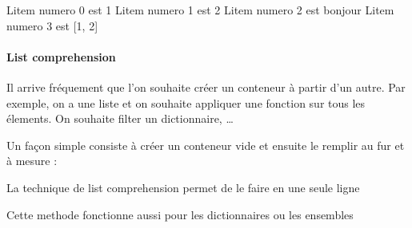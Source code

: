 \documentclass[letterpaper,10pt,english]{sphinxhowto}
\begin{document}
\begin{sphinxVerbatim}[commandchars=\\\{\}]
L\PYGZsq{}item numero 0 est 1
L\PYGZsq{}item numero 1 est 2
L\PYGZsq{}item numero 2 est bonjour
L\PYGZsq{}item numero 3 est [1, 2]
\end{sphinxVerbatim}


\paragraph{List comprehension}
\label{\detokenize{cours3_conteneur_cours:list-comprehension}}
\sphinxAtStartPar
Il arrive fréquement que l’on souhaite créer un conteneur à partir d’un autre. Par exemple, on a une liste et on souhaite appliquer une fonction sur tous les élements. On souhaite filter un dictionnaire, …

\sphinxAtStartPar
Un façon simple consiste à créer un conteneur vide et ensuite le remplir au fur et à mesure :

\begin{sphinxVerbatim}[commandchars=\\\{\}]
  \PYG{p}{[}   \PYG{p}{]}
  \PYG{p}{[}\PYG{p}{]}
   
\end{sphinxVerbatim}

\sphinxAtStartPar
La technique de list comprehension permet de le faire en une seule ligne

\begin{sphinxVerbatim}[commandchars=\\\{\}]
  \PYG{p}{[}    \PYG{p}{]}
\end{sphinxVerbatim}

\sphinxAtStartPar
Cette methode fonctionne aussi pour les dictionnaires ou les ensembles

\begin{sphinxVerbatim}[commandchars=\\\{\}]
  \PYG{p}{[} \PYG{p}{]}
     

     
\end{sphinxVerbatim}
\end{document}
